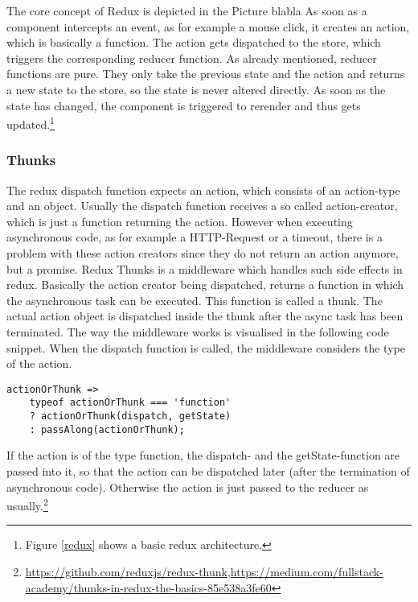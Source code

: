 The core concept of Redux is depicted in the Picture blabla
As soon as a component intercepts an event, as for example a mouse click, it creates an action, which is basically a function. The action gets dispatched to the store, which triggers the corresponding reducer function. As already mentioned, reducer functions are pure. They only take the previous state and the action and returns a new state to the store, so the state is never altered directly. As soon as the state has changed, the component is triggered to rerender and thus gets updated.\footnote{Figure \ref{redux} shows a basic redux architecture.}

\subsubsection{Thunks}

The redux dispatch function expects an action, which consists of an action-type and an object. Usually the dispatch function receives a so called action-creator, which is just a function returning the action. 
However when executing asynchronous code, as for example a HTTP-Request or a timeout, there is a problem with these action creators since they do not return an action anymore, but a promise.
Redux Thunks is a middleware which handles such side effects in redux. Basically the action creator being dispatched, returns a function in which the asynchronous task can be executed. This function is called a thunk. The actual action object is dispatched inside the thunk after the async task has been terminated.
The way the middleware works is visualised in the following code snippet. When the dispatch function is called, the middleware considers the type of the action.

\begin{lstlisting}[frame=single, backgroundcolor=\color{light-gray}]
actionOrThunk =>
	typeof actionOrThunk === 'function'
	? actionOrThunk(dispatch, getState)
	: passAlong(actionOrThunk);
\end{lstlisting}

If the action is of the type function, the dispatch- and the getState-function are passed into it, so that the action can be dispatched later (after the termination of asynchronous code).
Otherwise the action is just passed to the reducer as usually.\footnote{\url{https://github.com/reduxjs/redux-thunk},\url{https://medium.com/fullstack-academy/thunks-in-redux-the-basics-85e538a3fe60}}

